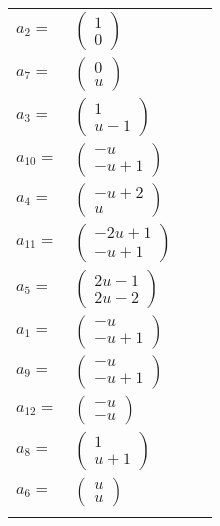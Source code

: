 \documentclass[1p]{elsarticle_modified}
\theoremstyle{definition}
\begin{document}
\begin{tabular}{m{7pt} m{180pt} m{7pt} m{180pt} }
\flushright $a_{2}=$&$\begin{pmatrix}1\\0\end{pmatrix}$ \\
\flushright $a_{7}=$&$\begin{pmatrix}0\\u\end{pmatrix}$ \\
\flushright $a_{3}=$&$\begin{pmatrix}1\\u-1\end{pmatrix}$ \\
\flushright $a_{10}=$&$\begin{pmatrix}- u\\- u+1\end{pmatrix}$ \\
\flushright $a_{4}=$&$\begin{pmatrix}- u+2\\u\end{pmatrix}$ \\
\flushright $a_{11}=$&$\begin{pmatrix}-2 u+1\\- u+1\end{pmatrix}$ \\
\flushright $a_{5}=$&$\begin{pmatrix}2 u-1\\2 u-2\end{pmatrix}$ \\
\flushright $a_{1}=$&$\begin{pmatrix}- u\\- u+1\end{pmatrix}$ \\
\flushright $a_{9}=$&$\begin{pmatrix}- u\\- u+1\end{pmatrix}$ \\
\flushright $a_{12}=$&$\begin{pmatrix}- u\\- u\end{pmatrix}$ \\
\flushright $a_{8}=$&$\begin{pmatrix}1\\u+1\end{pmatrix}$ \\
\flushright $a_{6}=$&$\begin{pmatrix}u\\u\end{pmatrix}$\\&\end{tabular}
\end{document}
